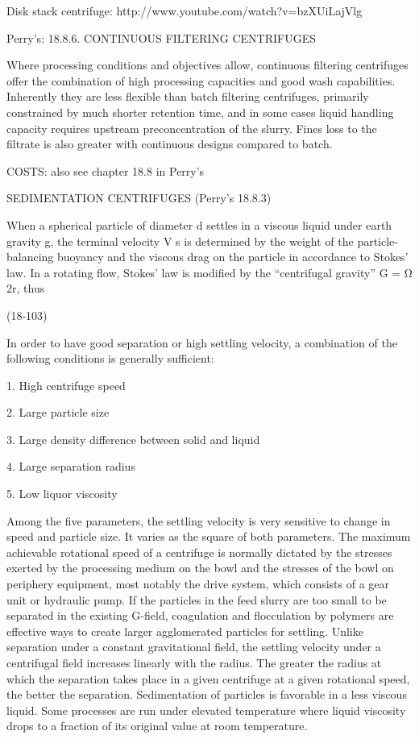 Disk stack centrifuge: http://www.youtube.com/watch?v=bzXUiLajVlg

Perry's: 18.8.6. CONTINUOUS FILTERING CENTRIFUGES

Where processing conditions and objectives allow, continuous filtering centrifuges offer the combination of high processing capacities and good wash capabilities. Inherently they are less flexible than batch filtering centrifuges, primarily constrained by much shorter retention time, and in some cases liquid handling capacity requires upstream preconcentration of the slurry. Fines loss to the filtrate is also greater with continuous designs compared to batch.

COSTS: also see chapter 18.8 in Perry's


SEDIMENTATION CENTRIFUGES (Perry's 18.8.3)

When a spherical particle of diameter d settles in a viscous liquid under earth gravity g, the terminal velocity V s is determined by the weight of the particle-balancing buoyancy and the viscous drag on the particle in accordance to Stokes’ law. In a rotating flow, Stokes’ law is modified by the “centrifugal gravity” G = Ω 2r, thus

(18-103)

In order to have good separation or high settling velocity, a combination of the following conditions is generally sufficient:

1. High centrifuge speed

2. Large particle size

3. Large density difference between solid and liquid

4. Large separation radius

5. Low liquor viscosity

Among the five parameters, the settling velocity is very sensitive to change in speed and particle size. It varies as the square of both parameters. The maximum achievable rotational speed of a centrifuge is normally dictated by the stresses exerted by the processing medium on the bowl and the stresses of the bowl on periphery equipment, most notably the drive system, which consists of a gear unit or hydraulic pump. If the particles in the feed slurry are too small to be separated in the existing G-field, coagulation and flocculation by polymers are effective ways to create larger agglomerated particles for settling. Unlike separation under a constant gravitational field, the settling velocity under a centrifugal field increases linearly with the radius. The greater the radius at which the separation takes place in a given centrifuge at a given rotational speed, the better the separation. Sedimentation of particles is favorable in a less viscous liquid. Some processes are run under elevated temperature where liquid viscosity drops to a fraction of its original value at room temperature.


